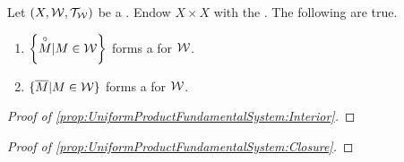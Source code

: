 \begin{prop}
\label{prop:UniformProductFundamentalSystem}
    Let $(X,\mathcal{W}, \mathcal{T}_{\mathcal{W}})$ be a \UniformSpace. 
    Endow $X \times X$ with the \ProductTopology.
    The following are true. 
    \begin{enumerate}[label=(\roman*), ref={\ref{prop:UniformProductFundamentalSystem}~\roman*}]
        \item 
        \label{prop:UniformProductFundamentalSystem:Interior}
        $\left\{\overset{\circ}{M} | M \in \mathcal{W}\right\}$
        forms a 
        \FundamentalSystemOfEntourages
        for $\mathcal{W}$.
        \item 
        \label{prop:UniformProductFundamentalSystem:Closure}
        $\{\overline{M} | M \in \mathcal{W}\}$
        forms a 
        \FundamentalSystemOfEntourages
        for $\mathcal{W}$.
    \end{enumerate}
    \begin{proof}[Proof of \ref{prop:UniformProductFundamentalSystem:Interior}]

    \end{proof}
    \begin{proof}[Proof of \ref{prop:UniformProductFundamentalSystem:Closure}]
    \end{proof}
\end{prop}
